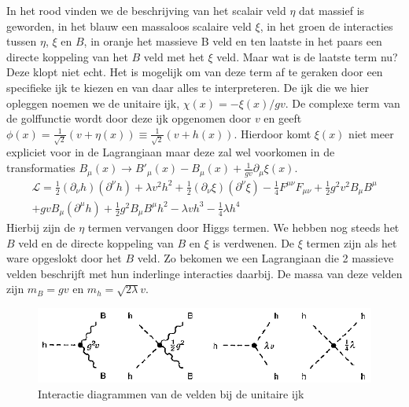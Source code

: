 \documentclass[../main.tex]{subfiles}
\begin{document}
In het rood vinden we de beschrijving van het scalair veld $\eta$ dat massief is geworden, in het blauw een massaloos scalaire veld $\xi$, in het groen de interacties tussen $\eta$, $\xi$ en $B$, in oranje het massieve B veld en ten laatste in het paars een directe koppeling van het $B$ veld met het $\xi$ veld. Maar wat is de laatste term nu? Deze klopt niet echt. Het is mogelijk om van deze term af te geraken door een specifieke ijk te kiezen en van daar alles te interpreteren. De ijk die we hier opleggen noemen we de unitaire ijk, $\chi(x) = -\xi(x)/gv$. De complexe term van de golffunctie wordt door deze ijk opgenomen door $v$ en geeft $\phi(x) = \frac{1}{\sqrt{2}} (v+\eta(x)) \equiv \frac{1}{\sqrt{2}} (v+h(x))$. Hierdoor komt $\xi(x)$ niet meer expliciet voor in de Lagrangiaan maar deze zal wel voorkomen in de transformaties $B_\mu (x) \rightarrow B'_\mu(x) - B_\mu(x) + \frac{1}{gv} \partial_\mu \xi(x)$.
\begin{equation}
    \begin{aligned}
        \label{eq:comp_scal_veld_lagr_unitaire_ijk}
        \mathcal{L} = \frac{1}{2} (\partial_\nu h)(\partial^\nu h) + \lambda v^2 h^2 + \frac{1}{2} (\partial_\nu\xi)(\partial^\nu\xi) - \frac{1}{4} F^{\mu\nu}F_{\mu\nu} + \frac{1}{2} g^2v^2B_\mu B^\mu\\
        + gvB_\mu(\partial^\mu h) + \frac{1}{2} g^2 B_\mu B^\mu h^2 - \lambda vh^3 - \frac{1}{4} \lambda h^4
    \end{aligned}
\end{equation}
Hierbij zijn de $\eta$ termen vervangen door Higgs termen. We hebben nog steeds het $B$ veld en de directe koppeling van $B$ en $\xi$ is verdwenen. De $\xi$ termen zijn als het ware opgeslokt door het $B$ veld. Zo bekomen we een Lagrangiaan die 2 massieve velden beschrijft met hun inderlinge interacties daarbij. De massa van deze velden zijn $m_B = gv$ en $m_h = \sqrt{2\lambda}v$.

\begin{figure}[h]
    \centering
    \includegraphics[width=0.8\linewidth]{higgs_boson/complex_scal_int_unitaire_ijk.png}
    \caption{Interactie diagrammen van de velden bij de unitaire ijk}%
    \label{fig:higgs_boson/complex_scal_int_unitaire_ijk}
\end{figure}
\end{document}

